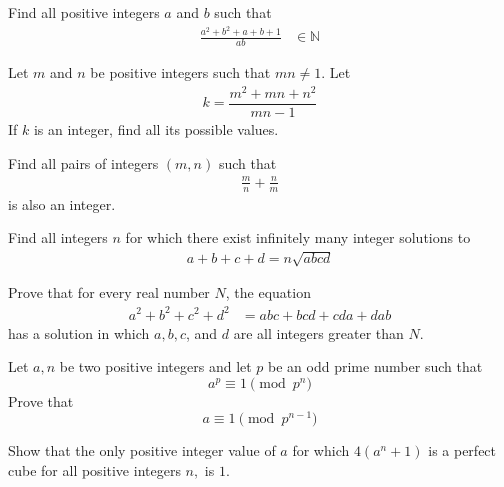 \documentclass{subfile}
\begin{document}
	\begin{problem} %
		Find all positive integers $a$ and $b$ such that
			\begin{align*}
				 \frac{a^2+b^2+a+b+1}{ab}
				 	& \in\mathbb{N}
			\end{align*}
	\end{problem}

	\begin{problem} %
		Let $m$ and $n$ be positive integers such that $mn \neq 1$. Let
			\begin{align*}
				k= \dfrac{m^2+mn+n^2}{mn-1}
			\end{align*}
		If $k$ is an integer, find all its possible values.
	\end{problem}

	\begin{problem}
		Find all pairs of integers $( m, n )$ such that
			\begin{align*}
				 \frac{ m } { n } + \frac{ n}{m}
			\end{align*}
		is also an integer.
	\end{problem}

	\begin{problem}[Vietnam 2002]
		Find all integers \(n\) for which there exist infinitely many integer solutions to
			\begin{align*}
				a + b + c + d = n \sqrt{ abcd }
			\end{align*}
	\end{problem}

	\begin{problem}[Putnam 1933]
		Prove that for every real number $N$, the equation
			\begin{align*}
				a^2 + b^2 + c^2 + d^2
					& = abc + bcd + cda + dab
			\end{align*}
		has a solution in which $a, b, c$, and $d$ are all integers greater than $N$.
	\end{problem}

	\begin{problem}
		Let $a,n$ be two positive integers and let $p$ be an odd prime number such that
		\[a^p \equiv 1 \pmod{p^n}\]
		Prove that
		\[a \equiv 1 \pmod{p^{n-1}}\]
	\end{problem}

	\begin{problem}
		Show that the only positive integer value of $a$ for which $4(a^n+1)$ is a perfect cube for all positive integers $n,$ is $1.$
	\end{problem}
\end{document}
